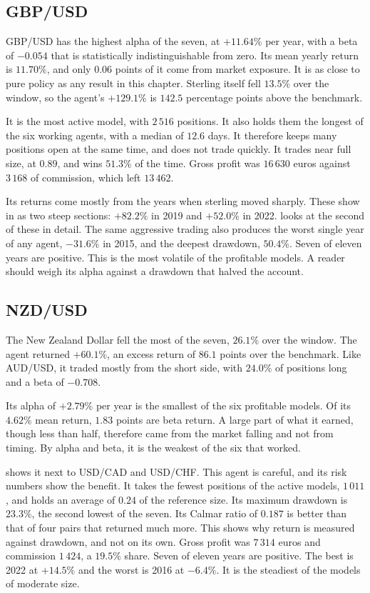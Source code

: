 \subsection{GBP/USD}

GBP/USD has the highest alpha of the seven, at $+11.64\%$ per year, with a beta of $-0.054$ that is statistically indistinguishable from zero. Its mean yearly return is $11.70\%$, and only $0.06$ points of it come from market exposure. It is as close to pure policy as any result in this chapter. Sterling itself fell $13.5\%$ over the window, so the agent's $+129.1\%$ is $142.5$ percentage points above the benchmark.

It is the most active model, with $2\,516$ positions. It also holds them the longest of the six working agents, with a median of $12.6$ days. It therefore keeps many positions open at the same time, and does not trade quickly. It trades near full size, at $0.89$, and wins $51.3\%$ of the time. Gross profit was $16\,630$ euros against $3\,168$ of commission, which left $13\,462$.

Its returns come mostly from the years when sterling moved sharply. These show in  as two steep sections: $+82.2\%$ in 2019 and $+52.0\%$ in 2022.  looks at the second of these in detail. The same aggressive trading also produces the worst single year of any agent, $-31.6\%$ in 2015, and the deepest drawdown, $50.4\%$. Seven of eleven years are positive. This is the most volatile of the profitable models. A reader should weigh its alpha against a drawdown that halved the account.

\subsection{NZD/USD}

The New Zealand Dollar fell the most of the seven, $26.1\%$ over the window. The agent returned $+60.1\%$, an excess return of $86.1$ points over the benchmark. Like AUD/USD, it traded mostly from the short side, with $24.0\%$ of positions long and a beta of $-0.708$.

Its alpha of $+2.79\%$ per year is the smallest of the six profitable models. Of its $4.62\%$ mean return, $1.83$ points are beta return. A large part of what it earned, though less than half, therefore came from the market falling and not from timing. By alpha and beta, it is the weakest of the six that worked.

 shows it next to USD/CAD and USD/CHF. This agent is careful, and its risk numbers show the benefit. It takes the fewest positions of the active models, $1\,011$, and holds an average of $0.24$ of the reference size. Its maximum drawdown is $23.3\%$, the second lowest of the seven. Its Calmar ratio of $0.187$ is better than that of four pairs that returned much more. This shows why return is measured against drawdown, and not on its own. Gross profit was $7\,314$ euros and commission $1\,424$, a $19.5\%$ share. Seven of eleven years are positive. The best is 2022 at $+14.5\%$ and the worst is 2016 at $-6.4\%$. It is the steadiest of the models of moderate size.

